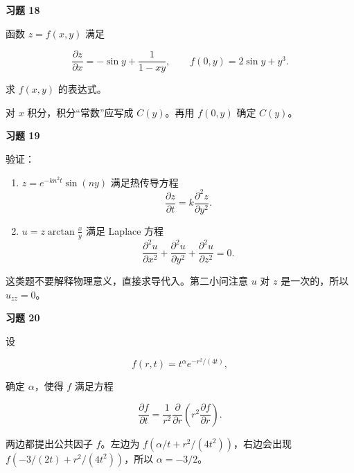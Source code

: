 \begin{exercisebox}
\textbf{习题 18}

函数 \(z=f(x,y)\) 满足

\[
        \frac{\partial z}{\partial x}
        =-\sin y+\frac1{1-xy},
        \qquad
        f(0,y)=2\sin y+y^3.
      \]

求 \(f(x,y)\) 的表达式。

\begin{hintbox}
对 \(x\) 积分，积分“常数”应写成 \(C(y)\)。再用 \(f(0,y)\) 确定 \(C(y)\)。
\end{hintbox}
\end{exercisebox}

\begin{exercisebox}
\textbf{习题 19}

验证：

\begin{enumerate}
 \item \(z=e^{-kn^2t}\sin(ny)\) 满足热传导方程 \[
          \frac{\partial z}{\partial t}=k\frac{\partial^2z}{\partial y^2}.
          \]
 \item \(u=z\arctan\frac{x}{y}\) 满足 Laplace 方程 \[
          \frac{\partial^2u}{\partial x^2}
          +\frac{\partial^2u}{\partial y^2}
          +\frac{\partial^2u}{\partial z^2}=0.
          \]
 \end{enumerate}

\begin{hintbox}
这类题不要解释物理意义，直接求导代入。第二小问注意 \(u\) 对 \(z\) 是一次的，所以 \(u_{zz}=0\)。
\end{hintbox}
\end{exercisebox}

\begin{exercisebox}
\textbf{习题 20}

设

\[
        f(r,t)=t^\alpha e^{-r^2/(4t)},
      \]

确定 \(\alpha\)，使得 \(f\) 满足方程

\[
        \frac{\partial f}{\partial t}
        =
        \frac1{r^2}\frac{\partial}{\partial r}
        \left(r^2\frac{\partial f}{\partial r}\right).
      \]

\begin{hintbox}
两边都提出公共因子 \(f\)。左边为 \(f(\alpha/t+r^2/(4t^2))\)，右边会出现 \(f(-3/(2t)+r^2/(4t^2))\)，所以 \(\alpha=-3/2\)。
\end{hintbox}
\end{exercisebox}

